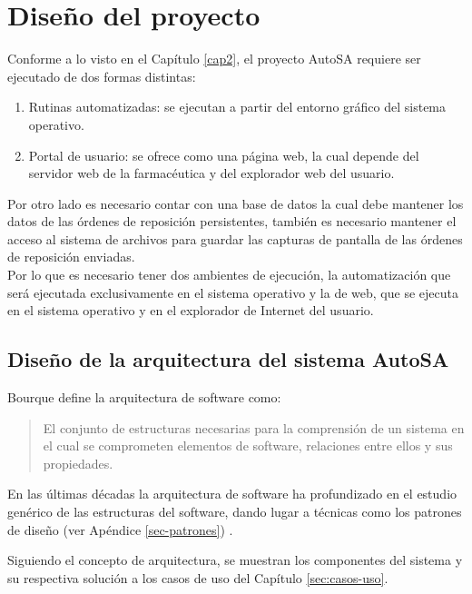 \chapter{Diseño del proyecto}\label{cap3}
Conforme a lo visto en el Capítulo \ref{cap2}, el proyecto AutoSA requiere ser ejecutado de dos formas distintas:
\begin{enumerate}
 	\item Rutinas automatizadas: se ejecutan a partir del entorno gráfico del sistema operativo.
 	\item Portal de usuario: se ofrece como una página web, la cual depende del servidor web de la farmacéutica y del explorador web del usuario.
\end{enumerate}
Por otro lado es necesario contar con una base de datos la cual debe mantener los datos de las órdenes de reposición persistentes, también es necesario mantener el acceso al sistema de archivos para guardar las capturas de pantalla de las órdenes de reposición enviadas.\\
Por lo que es necesario tener dos ambientes de ejecución, la automatización que será ejecutada exclusivamente en el sistema operativo y la de web, que se ejecuta en el sistema operativo y en el explorador de Internet del usuario.




\section{Diseño de la arquitectura del sistema AutoSA}
Bourque\cite{SWEBOOK} define la arquitectura de software como:
\begin{quote}
	El conjunto de estructuras necesarias para la comprensión de un sistema en el cual se comprometen elementos de software, relaciones entre ellos y sus propiedades.
\end{quote}
En las últimas décadas la arquitectura de software ha profundizado en el estudio genérico de las estructuras del software, dando lugar a técnicas como los patrones de diseño (ver Apéndice \ref{sec-patrones}) \cite{SWEBOOK, SoftwareArchitectureInAction}.

Siguiendo el concepto de arquitectura, se muestran los componentes del sistema y su respectiva solución a los casos de uso del Capítulo \ref{sec:casos-uso}.

